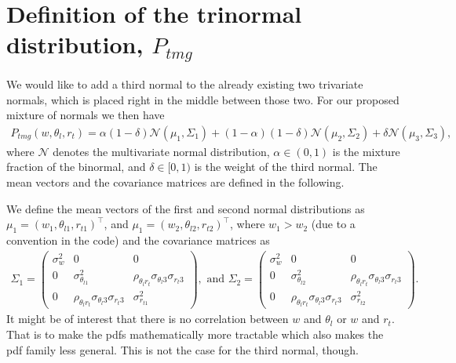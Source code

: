\section{Definition of the trinormal distribution, \texorpdfstring{$P_{tmg}$}{P tmg}}
\label{sec:definition-of-the-trinormal-distribution-p_tmg}

We would like to add a third normal to the already existing two trivariate normals,
which is placed right in the middle between those two.
For our proposed mixture of normals we then have
\begin{align}
	\label{eq:normal_mix_pdf}
	P_{tmg}(w, \theta_l, r_t)
	= \alpha (1-\delta) \mathcal{N}(\mu_1, \Sigma_1)
	+ (1-\alpha) (1-\delta) \mathcal{N}(\mu_2, \Sigma_2)
	+ \delta \mathcal{N}(\mu_3, \Sigma_3),
\end{align}
where $\mathcal{N}$ denotes the multivariate normal distribution,
$\alpha \in (0,1)$ is the mixture fraction of the binormal,
and $\delta \in [0,1)$ is the weight of the third normal.
The mean vectors and the covariance matrices are defined in the following.

We define the mean vectors of the first
and second normal distributions as $\mu_1 = (w_1, \theta_{l1}, r_{t1})^\top$,
and $\mu_1 = (w_2, \theta_{l2}, r_{t2})^\top$,
where $w_1 > w_2$ (due to a convention in the code) and the covariance matrices as
\begin{align}
	\Sigma_1 =
	\begin{pmatrix}
		\sigma_w^2 & 0                                                      & 0                                                      \\
		0          & \sigma_{\theta_{l1}}^2                                 & \rho_{\theta_l r_t} \sigma_{\theta_l 3} \sigma_{r_t 3} \\
		0          & \rho_{\theta_l r_t} \sigma_{\theta_l 3} \sigma_{r_t 3} & \sigma_{r_{t1}}^2
	\end{pmatrix},
	\text{ and }
	\Sigma_2 =
	\begin{pmatrix}
		\sigma_w^2 & 0                                                      & 0                                                      \\
		0          & \sigma_{\theta_{l2}}^2                                 & \rho_{\theta_l r_t} \sigma_{\theta_l 3} \sigma_{r_t 3} \\
		0          & \rho_{\theta_l r_t} \sigma_{\theta_l 3} \sigma_{r_t 3} & \sigma_{r_{t2}}^2
	\end{pmatrix}.
\end{align}
It might be of interest that there is no correlation between $w$ and $\theta_l$ or $w$ and $r_t$.
That is to make the \glspl{pdf} mathematically more tractable which also makes the \gls{pdf} family less general.
This is not the case for the third normal, though.

